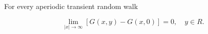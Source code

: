 For every aperiodic transient random walk

$$\lim_{|x| \to \infty} [G(x,y) - G(x,0)] = 0, \quad y \in R.$$